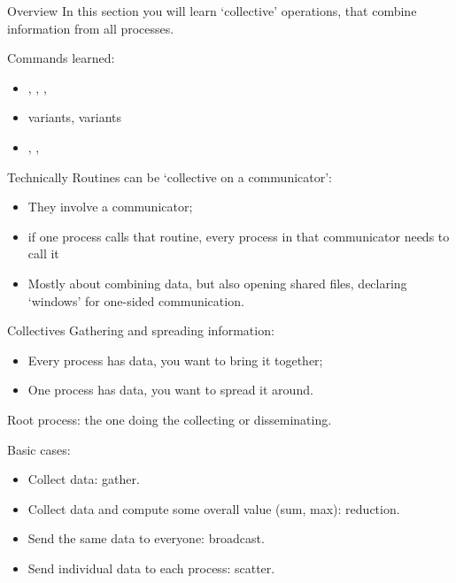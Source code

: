 
\begin{numberedframe}{Overview}
  In this section you will learn `collective' operations, that combine
  information from all processes.

  Commands learned:
  \begin{itemize}
  \item {}, , , 
  \item {} variants,  variants
  \item {}, , 
  \end{itemize}
\end{numberedframe}

\begin{numberedframe}{Technically}
  Routines can be `collective on a communicator': 
  \begin{itemize}
  \item They involve a communicator;
  \item if one process calls that routine, every process in that
    communicator needs to call it
  \item Mostly about combining data, but also opening shared files,
    declaring `windows' for one-sided communication.
  \end{itemize}
\end{numberedframe}


\begin{numberedframe}{Collectives}
  Gathering and spreading information:
  \begin{itemize}
  \item Every process has data, you want to bring it together;
  \item One process has data, you want to spread it around.
  \end{itemize}
  Root process: the one doing the collecting or disseminating.

  Basic cases:
  \begin{itemize}
  \item Collect data: gather.
  \item Collect data and compute some overall value (sum, max): reduction.
  \item Send the same data to everyone: broadcast.
  \item Send individual data to each process: scatter.
  \end{itemize}
\end{numberedframe}

